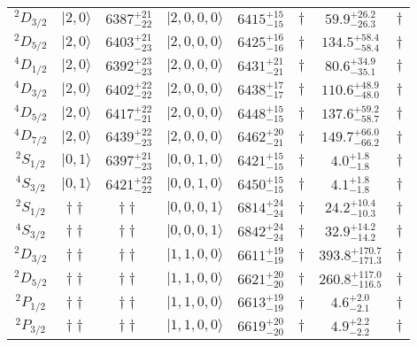 \begin{tabular}{c| c c c c c c c}
$^{2}D_{3/2}$ & $\vert 2,0 \rangle$ & $6387^{+21}_{-22}$ & $\vert 2,0,0,0 \rangle $ & $6415^{+15}_{-15}$ & $\dagger$ & $59.9^{+26.2}_{-26.3}$ & $\dagger$ \\ 
$^{2}D_{5/2}$ & $\vert 2,0 \rangle$ & $6403^{+21}_{-23}$ & $\vert 2,0,0,0 \rangle $ & $6425^{+16}_{-16}$ & $\dagger$ & $134.5^{+58.4}_{-58.4}$ & $\dagger$ \\ 
$^{4}D_{1/2}$ & $\vert 2,0 \rangle$ & $6392^{+23}_{-23}$ & $\vert 2,0,0,0 \rangle $ & $6431^{+21}_{-21}$ & $\dagger$ & $80.6^{+34.9}_{-35.1}$ & $\dagger$ \\ 
$^{4}D_{3/2}$ & $\vert 2,0 \rangle$ & $6402^{+22}_{-22}$ & $\vert 2,0,0,0 \rangle $ & $6438^{+17}_{-17}$ & $\dagger$ & $110.6^{+48.9}_{-48.0}$ & $\dagger$ \\ 
$^{4}D_{5/2}$ & $\vert 2,0 \rangle$ & $6417^{+22}_{-21}$ & $\vert 2,0,0,0 \rangle $ & $6448^{+15}_{-15}$ & $\dagger$ & $137.6^{+59.2}_{-58.7}$ & $\dagger$ \\ 
$^{4}D_{7/2}$ & $\vert 2,0 \rangle$ & $6439^{+22}_{-23}$ & $\vert 2,0,0,0 \rangle $ & $6462^{+20}_{-21}$ & $\dagger$ & $149.7^{+66.0}_{-66.2}$ & $\dagger$ \\ 
$^{2}S_{1/2}$ & $\vert 0,1 \rangle$ & $6397^{+21}_{-23}$ & $\vert 0,0,1,0 \rangle $ & $6421^{+15}_{-15}$ & $\dagger$ & $4.0^{+1.8}_{-1.8}$ & $\dagger$ \\ 
$^{4}S_{3/2}$ & $\vert 0,1 \rangle$ & $6421^{+22}_{-22}$ & $\vert 0,0,1,0 \rangle $ & $6450^{+15}_{-15}$ & $\dagger$ & $4.1^{+1.8}_{-1.8}$ & $\dagger$ \\ 
$^{2}S_{1/2}$ & $\dagger\dagger$ & $\dagger\dagger$ & $\vert 0,0,0,1 \rangle $ & $6814^{+24}_{-24}$ & $\dagger$ & $24.2^{+10.4}_{-10.3}$ & $\dagger$ \\ 
$^{4}S_{3/2}$ & $\dagger\dagger$ & $\dagger\dagger$ & $\vert 0,0,0,1 \rangle $ & $6842^{+24}_{-24}$ & $\dagger$ & $32.9^{+14.2}_{-14.2}$ & $\dagger$ \\ 
$^{2}D_{3/2}$ & $\dagger\dagger$ & $\dagger\dagger$ & $\vert 1,1,0,0 \rangle $ & $6611^{+19}_{-19}$ & $\dagger$ & $393.8^{+170.7}_{-171.3}$ & $\dagger$ \\ 
$^{2}D_{5/2}$ & $\dagger\dagger$ & $\dagger\dagger$ & $\vert 1,1,0,0 \rangle $ & $6621^{+20}_{-20}$ & $\dagger$ & $260.8^{+117.0}_{-116.5}$ & $\dagger$ \\ 
$^{2}P_{1/2}$ & $\dagger\dagger$ & $\dagger\dagger$ & $\vert 1,1,0,0 \rangle $ & $6613^{+19}_{-19}$ & $\dagger$ & $4.6^{+2.0}_{-2.1}$ & $\dagger$ \\ 
$^{2}P_{3/2}$ & $\dagger\dagger$ & $\dagger\dagger$ & $\vert 1,1,0,0 \rangle $ & $6619^{+20}_{-20}$ & $\dagger$ & $4.9^{+2.2}_{-2.2}$ & $\dagger$ \\ 

\end{tabular}
